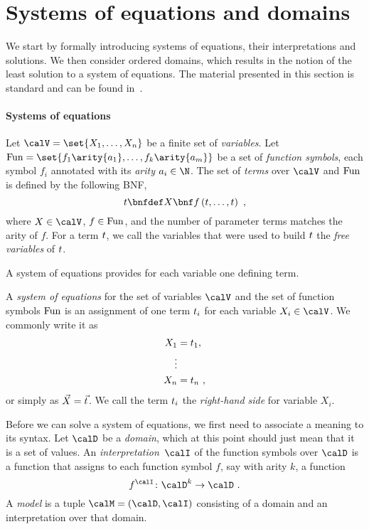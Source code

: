 \documentclass[../../diss.tex]{subfiles}
\begin{document}
\section{Systems of equations and domains}%
\label{Section:EDSEqSys}%

We start by formally introducing systems of equations, their interpretations and solutions.
We then consider ordered domains, which results in the notion of the least solution to a system of equations.
The material presented in this section is standard and can be found \eg in~\cite{NielsonNH99}.

\paragraph{Systems of equations}

Let $\vars = \set{X_1, \ldots, X_n}$ be a finite set of \emph{variables}.
Let $\funs = \set{f_1\arity{a_1}, \ldots, f_k\arity{a_m}}$ be a set of \emph{function symbols}, each symbol $f_i$ annotated with its \emph{arity} $a_i \in \N$.
The set of \emph{terms} over $\vars$ and $\text{Fun}$ is defined by the following BNF,\@
\[
    \term \bnfdef X \bnf f \left( \term, \ldots, \term \right)
    \ ,
\]
where $X \in \vars$, $f \in \text{Fun}$, and the number of parameter terms matches the arity of $f$.
For a term $t$, we call the variables that were used to build $t$ the \emph{free variables} of $t$.


A system of equations provides for each variable one defining term.

\begin{definition}
    A \emph{system of equations} for the set of variables $\vars$ and the set of function symbols $\text{Fun}$ is an assignment of one term $t_i$ for each variable $X_i \in \vars$.
    We commonly write it as
    \begin{align*}
        X_1 &= t_1,
        \\
        \vdots
        \\
        X_n &= t_n
        \ ,
    \end{align*}
    or simply as $\vec{X} = \vec{t}$.
    We call the term $t_i$ the \emph{right-hand side} for variable $X_i$.
\end{definition}

Before we can solve a system of equations, we first need to associate a meaning to its syntax.
Let $\domain$ be a \emph{domain}, which at this point should just mean that it is a set of values.
An \emph{interpretation}~$\interpretation$ of the function symbols over $\domain$ is a function that assigns to each function symbol $f$, say with arity $k$, a function
\[
    f^\interpretation \colon \domain^k \to \domain
    \ .
\]
A \emph{model} is a tuple $\model = (\domain,\interpretation)$ consisting of a domain and an interpretation over that domain.
\end{document}
